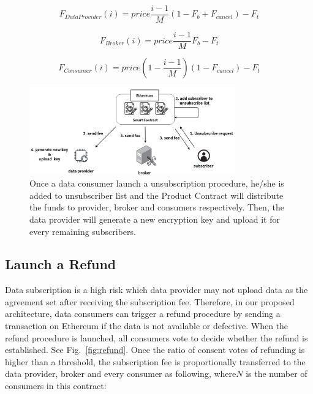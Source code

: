 \documentclass[conference]{IEEEtran}
\begin{document}
\begin{equation}
\label{equation:unsubscribe_provider}
    F_{DataProvider}(i) = price \frac{i-1}{M} (1-F_{b}+F_{cancel}) -F_{t} 
\end{equation}

\begin{equation}
\label{equation:unsubscribe_broker}
    F_{Broker}(i) = price \frac{i-1}{M} F_{b} -F_{t}
\end{equation}

\begin{equation}
\label{equation:unsubscribe_consumer}
    F_{Consumer}(i) = price (1-\frac{i-1}{M})(1 -F_{cancel}) -F_{t}
\end{equation}

\begin{figure}[h]
    \centering
    \includegraphics[width=3.5in]{unsubscribe}
    \caption{Once a data consumer launch a unsubscription procedure, he/she is added to unsubscriber list and the Product Contract will distribute the funds to provider, broker and consumers respectively. Then, the data provider will generate a new encryption key and upload it for every remaining subscribers.}
    \label{fig:unsubscribe}
\end{figure}

\subsection{Launch a Refund}
Data subscription is a high risk which data provider may not upload data as the agreement set after receiving the subscription fee. Therefore, in our proposed architecture, data consumers can trigger a refund procedure by sending a transaction on Ethereum if the data is not available or defective. When the refund procedure is launched, all consumers vote to decide whether the refund is established. See Fig.~\ref{fig:refund}. Once the ratio of consent votes of refunding is higher than a threshold, the subscription fee is proportionally transferred to the data provider, broker and every consumer as following, where$N$ is the number of consumers in this contract:
\end{document}
